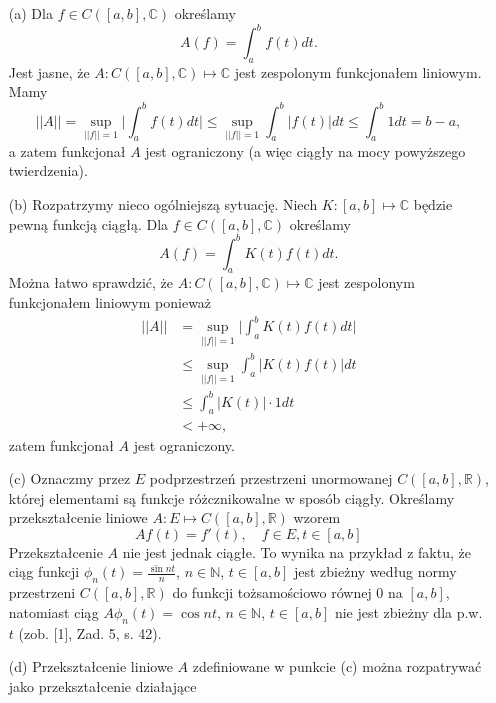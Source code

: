 \documentclass[leqno]{article}
\begin{document}
\begin{justify}
\begin{ex}
    \begin{itemize}
        \item [(a)]
            Dla $f \in C([a,b], \mathbb{C})$ określamy 
            \[
                A(f) = \int_{a}^{b}f(t)dt.
            \]
            Jest jasne, że $A : C([a,b], \mathbb{C}) \mapsto \mathbb{C}$ jest zespolonym funkcjonałem liniowym. Mamy 
            \[
                ||A|| = \sup_{||f||=1}\Big|\int_{a}^{b}f(t)dt\Big| \leqslant \sup_{||f||=1}\int_{a}^{b}|f(t)|dt \leqslant \int_{a}^{b}1 dt = b - a,
            \]
            a zatem funkcjonał $A$ jest ograniczony (a więc ciągły na mocy powyższego twierdzenia).
        \item [(b)]
            Rozpatrzymy nieco ogólniejszą sytuację. Niech $K : [a,b] \mapsto \mathbb{C}$ będzie pewną funkcją ciągłą.
            Dla $f \in C([a,b], \mathbb{C})$ określamy 
            \[
                A(f) = \int_{a}^{b}K(t)f(t)dt.
            \] 
            Można łatwo sprawdzić, że $A : C([a,b], \mathbb{C}) \mapsto \mathbb{C}$ jest zespolonym funkcjonałem liniowym ponieważ 
            \begin{align*}
                ||A|| &= \sup_{||f||=1}\Big|\int_{a}^{b}K(t)f(t)dt\Big| \\
                        &\leqslant \sup_{||f||=1}\int_{a}^{b}|K(t)f(t)|dt \\ 
                        &\leqslant \int_{a}^{b}|K(t)| \cdot 1dt \\
                        &< +\infty,
            \end{align*}
            zatem funkcjonał $A$ jest ograniczony.
        \item [(c)]
            Oznaczmy przez $E$ podprzestrzeń przestrzeni unormowanej $C([a,b], \mathbb{R})$, której
            elementami są funkcje różcznikowalne w sposób ciągły. Określamy przekształcenie liniowe 
            $A : E \mapsto C([a,b], \mathbb{R})$ wzorem 
            \[
                Af(t) = f'(t), \quad f \in E, t \in [a,b]
            \]
            Przekształcenie $A$ nie jest jednak ciągłe. To wynika na przykład z faktu, że ciąg funkcji $\phi_n(t) = \frac{\sin nt}{n}$, $n \in \mathbb{N}$,
            $t \in [a,b]$ jest zbieżny według normy przestrzeni $C([a,b], \mathbb{R})$ do funkcji tożsamościowo równej $0$ na $[a,b]$,
            natomiast ciąg $A\phi_n(t) = \cos nt$, $n \in \mathbb{N}$, $t \in [a,b]$ nie jest zbieżny dla p.w. $t$ (zob. [1], Zad. 5, s. 42).
        \item [(d)]
            Przekształcenie liniowe $A$ zdefiniowane w punkcie (c) można rozpatrywać jako przekształcenie działające 

\end{itemize}
\end{ex}
\end{justify}
\end{document}

